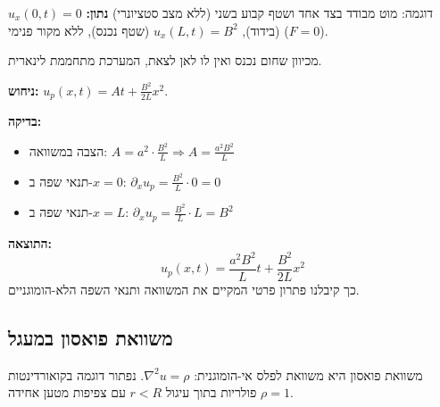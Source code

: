 \begin{examplebox}{דוגמה: מוט מבודד בצד אחד ושטף קבוע בשני (ללא מצב סטציונרי)}
\textbf{נתון:} $u_x(0,t) = 0$ (בידוד), $u_x(L,t) = B^2$ (שטף נכנס), ללא מקור פנימי ($F=0$).

מכיוון שחום נכנס ואין לו לאן לצאת, המערכת מתחממת לינארית.

\textbf{ניחוש:} $u_p(x,t) = At + \frac{B^2}{2L}x^2$.

\textbf{בדיקה:}
\begin{itemize}
\item הצבה במשוואה: $A = a^2 \cdot \frac{B^2}{L} \Rightarrow A = \frac{a^2 B^2}{L}$
\item תנאי שפה ב-$x=0$: $\partial_x u_p = \frac{B^2}{L} \cdot 0 = 0$ \checkmark
\item תנאי שפה ב-$x=L$: $\partial_x u_p = \frac{B^2}{L} \cdot L = B^2$ \checkmark
\end{itemize}

\textbf{התוצאה:}
\[
\boxed{u_p(x,t) = \frac{a^2 B^2}{L}t + \frac{B^2}{2L}x^2}
\]
כך קיבלנו פתרון פרטי המקיים את המשוואה ותנאי השפה הלא-הומוגניים.
\end{examplebox}

\subsection{משוואת פואסון במעגל}

משוואת פואסון היא משוואת לפלס אי-הומוגנית: $\nabla^2 u = \rho$.
נפתור דוגמה בקואורדינטות פולריות בתוך עיגול $r < R$ עם צפיפות מטען אחידה $\rho = 1$.

